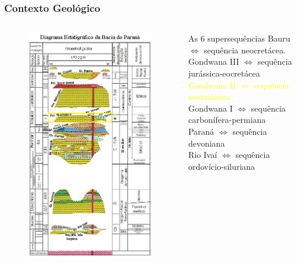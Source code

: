 \documentclass[aspectratio=10]{beamer} %
\begin{document}
\begin{frame}
\frametitle{Contexto Geológico}
\begin{columns}
\begin{column}{0.4\textwidth}
\begin{figure}
\includegraphics[scale=0.36]{Imagens/diagramagondwanaii.png}
\end{figure}
\end{column}
\begin{column}{0.55\textwidth}
\begin{block}{As $6$ supersequências}
Bauru $\Longleftrightarrow$  sequência neocretácea.\\
Gondwana III $\Longleftrightarrow$ sequência jurássica-eocretácea\\
\textcolor{yellow}{Gondwana II $\Longleftrightarrow$ sequência neotriássica} \\
Gondwana I $\Longleftrightarrow$ sequência carbonífera-permiana\\ 
Paraná $\Longleftrightarrow$ sequência devoniana\\
Rio Ivaí $\Longleftrightarrow$ sequência ordovício-siluriana\\
\cite{Vail_1977,assine_1994,milani_orogenias_1998}
\end{block}
\end{column}
\end{columns}
\end{frame}
\end{document}
